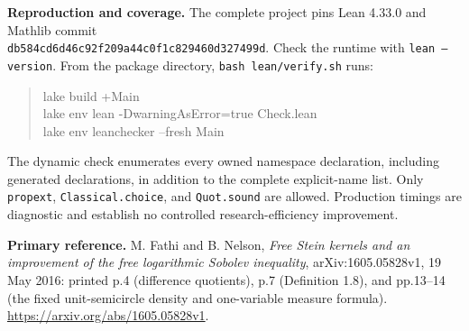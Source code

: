 \documentclass[11pt]{article}
\begin{document}
\textbf{Reproduction and coverage.}
The complete project pins Lean 4.33.0 and Mathlib commit\\
\texttt{db584cd6d46c92f209a44c0f1c829460d327499d}.
Check the runtime with \texttt{lean --version}. From the package directory,
\texttt{bash lean/verify.sh} runs:
\begin{quote}\small\ttfamily
lake build +Main\\
lake env lean -DwarningAsError=true Check.lean\\
lake env leanchecker --fresh Main
\end{quote}
The dynamic check enumerates every owned namespace declaration, including
generated declarations, in addition to the complete explicit-name list.
Only \texttt{propext}, \texttt{Classical.choice}, and \texttt{Quot.sound} are
allowed. Production timings are diagnostic and establish no controlled
research-efficiency improvement.

\textbf{Primary reference.}
M. Fathi and B. Nelson, \emph{Free Stein kernels and an improvement of the
free logarithmic Sobolev inequality}, arXiv:1605.05828v1, 19 May 2016:
printed p.4 (difference quotients), p.7 (Definition 1.8), and pp.13--14
(the fixed unit-semicircle density and one-variable measure formula).
\url{https://arxiv.org/abs/1605.05828v1}.
\end{document}
